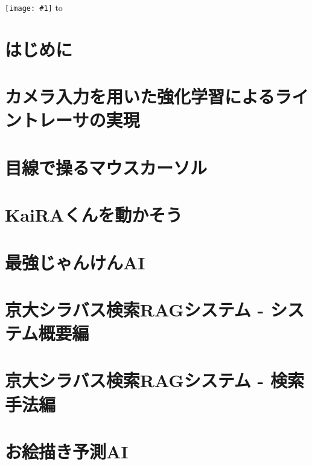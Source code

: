 \documentclass[dvipdfmx,openany]{jsbook}
\makeatletter
\numberwithin{equation}{section}     %
\def\@haikei#1{
\setbox\BackGroundUnit\hbox{\texttt{[image: \#1]}}
\@tempdima\paperheight
\advance\@tempdima\ht\BackGroundUnit\advance\@tempdima\dp\BackGroundUnit
\setbox\BackGround\vbox to \@tempdima{
        \@tempdima=\paperwidth\advance\@tempdima\wd\BackGroundUnit
        \leaders\hbox to\@tempdima{\leaders\copy\BackGroundUnit\hfil}\vfil
}
\wd\BackGround=0pt\ht\BackGround=0pt\dp\BackGround=0pt
}
\newcommand{\incluedefullgraphics}[1]{\pagestyle{empty}\@haikei{#1}\null}
\makeatother
\begin{document}
\begin{titlepage}
  \thispagestyle{empty}
  \incluedefullgraphics{cover.png}
\end{titlepage}

\chapter*{はじめに}


\tableofcontents

\chapter{カメラ入力を用いた強化学習によるライントレーサの実現}\label{chap:line-tracer}


\chapter{目線で操るマウスカーソル}\label{chap:eye-track-cursor}


\chapter{KaiRAくんを動かそう}\label{chap:moving-kaira-kun}


\chapter{最強じゃんけんAI}\label{chap:no-lose-janken}


\chapter{京大シラバス検索RAGシステム - システム概要編}\label{chap:syllabus-rag-overview}


\chapter{京大シラバス検索RAGシステム - 検索手法編}\label{chap:syllabus-rag-search}


\chapter{お絵描き予測AI}\label{chap:draw-forecast}

\end{document}
